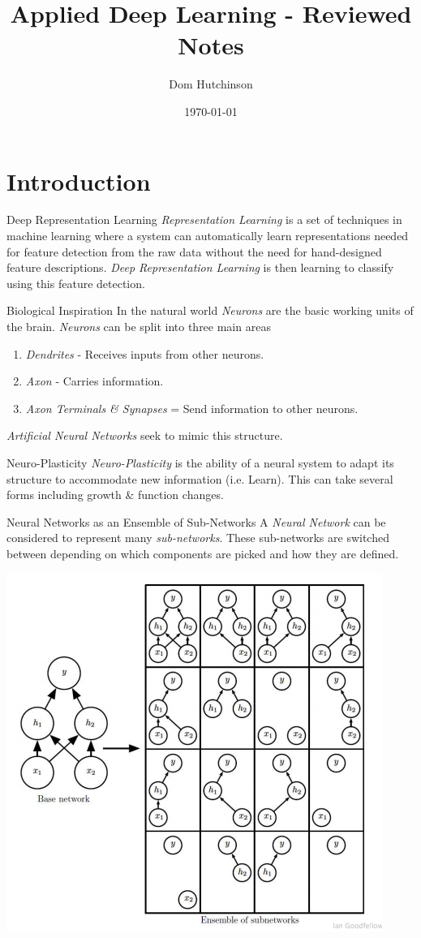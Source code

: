 \documentclass[11pt,a4paper]{article}
\begin{document}
\title{Applied Deep Learning - Reviewed Notes}
\author{Dom Hutchinson}
\date{\today}
\maketitle

\tableofcontents\newpage

\section{Introduction}

  \begin{definition}{Deep Representation Learning}
    \textit{Representation Learning} is a set of techniques in machine learning where a system can automatically learn representations needed for feature detection from the raw data without the need for hand-designed feature descriptions. \textit{Deep Representation Learning} is then learning to classify using this feature detection.
  \end{definition}

  \begin{remark}{Biological Inspiration}
    In the natural world \textit{Neurons} are the basic working units of the brain. \textit{Neurons} can be split into three main areas
    \begin{enumerate}
      \item \textit{Dendrites} - Receives inputs from other neurons.
      \item \textit{Axon} - Carries information.
      \item \textit{Axon Terminals \& Synapses} = Send information to other neurons.
    \end{enumerate}
    \textit{Artificial Neural Networks} seek to mimic this structure.
  \end{remark}

  \begin{definition}{Neuro-Plasticity}
    \textit{Neuro-Plasticity} is the ability of a neural system to adapt its structure to accommodate new information (i.e. Learn). This can take several forms including growth \& function changes.
  \end{definition}

  \begin{proposition}{Neural Networks as an Ensemble of Sub-Networks}
    A \textit{Neural Network} can be considered to represent many \textit{sub-networks}. These sub-networks are switched between depending on which components are picked and how they are defined.
    \begin{center}
      \includegraphics[width=.35\textwidth]{SubNeuralNetworks.PNG}
    \end{center}
  \end{proposition}
\end{document}

